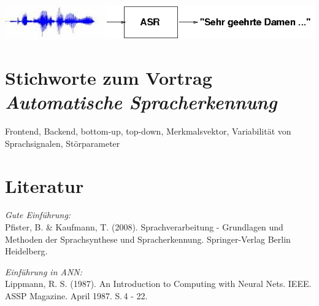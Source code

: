 \documentclass[11pt]{book}
\begin{document}
\includegraphics[width=\textwidth]{grafiken/automatische-spracherkennung/block.png}


\section{Stichworte zum Vortrag \em{Automatische Spracherkennung}}

Frontend, Backend, bottom-up, top-down, Merkmalsvektor, Variabilität von Sprachsignalen, Störparameter

\section{Literatur}

        {\em Gute Einführung:}\\
        Pfister, B. \& Kaufmann, T. (2008). Sprachverarbeitung - Grundlagen und 
	Methoden der Sprachsynthese und Spracherkennung. 
	Springer-Verlag Berlin Heidelberg.



        {\em Einführung in ANN:}\\
	Lippmann, R. S. (1987). An Introduction to Computing with Neural Nets.
	IEEE. ASSP Magazine. April 1987. S.\,4 - 22.

\end{document}
